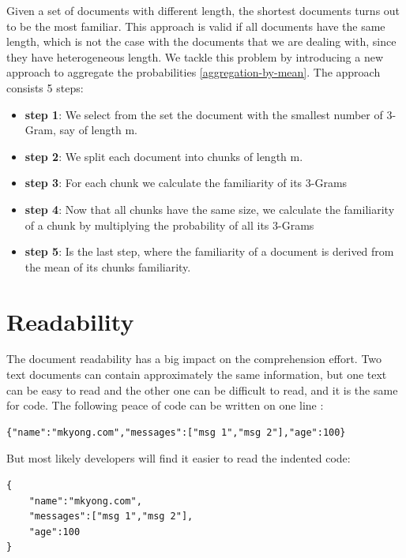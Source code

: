 \documentclass[12pt,mscthesis]{usiinfthesis}
\begin{document}
		Given a set of documents with different length, the shortest documents turns out to be the most familiar. This approach is valid if all documents have the same length, which is not the case with the documents that we are dealing with, since they have heterogeneous length. 
		\newpage
		We tackle this problem by introducing a new approach to aggregate the probabilities \cref{aggregation-by-mean}.
		The approach consists 5 steps: 
		\begin{itemize}
			\item \textbf{step 1}: We select from the set the document with the smallest number of 3-Gram, say of length m.
			\item \textbf{step 2}: We split each document into chunks of length m.
			\item \textbf{step 3}: For each chunk we calculate the familiarity of its 3-Grams
			\item \textbf{step 4}: Now that all chunks have the same size, we calculate the familiarity of a chunk by multiplying the probability of all its 3-Grams
			\item \textbf{step 5}: Is the last step, where the familiarity of a document is derived from the mean of its chunks familiarity.
		\end{itemize}

\section{Readability} 
	The document readability has a big impact on the comprehension effort. Two text documents can contain approximately the same information, but one text can be easy to read and the other one can be difficult to read, and it is the same for code. The following peace of code can be written on one line :

	\begin{lstlisting}
{"name":"mkyong.com","messages":["msg 1","msg 2"],"age":100}

	\end{lstlisting}

	
	But most likely developers will find it easier to read the indented code:\\

	 	\begin{lstlisting}
{
	"name":"mkyong.com",
	"messages":["msg 1","msg 2"],
	"age":100
}
	\end{lstlisting}
 
\end{document}
